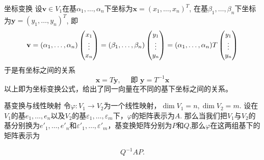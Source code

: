 \begin{frame}

\begin{block}{坐标变换}
设$\mathbf{v}\in V_1$在基$\alpha_1,\ldots,\alpha_n$下坐标为$\mathbf{x} = (x_1,\ldots,x_n)^T$, 在基$\beta_1,\ldots,\beta_n$下坐标为$\mathbf{y} = (y_1,\ldots,y_n)^T$, 即
\begin{displaymath}
\small
\mathbf{v} = (\alpha_1,\ldots,\alpha_n) \begin{pmatrix} x_1 \\ \vdots \\ x_n \end{pmatrix} = (\beta_1,\ldots,\beta_n) \begin{pmatrix} y_1 \\ \vdots \\ y_n \end{pmatrix} = (\alpha_1,\ldots,\alpha_n) T \begin{pmatrix} y_1 \\ \vdots \\ y_n \end{pmatrix}
\end{displaymath}
于是有坐标之间的关系
\[
\mathbf{x} = T\mathbf{y}, \quad \text{ 即 } \mathbf{y} = T^{-1}\mathbf{x}
\]
以上即为坐标变换公式，给出了同一向量在不同的基下坐标之间的关系。
\end{block}

\end{frame}


\begin{frame}

\begin{block}{基变换与线性映射}
令$\varphi: V_1 \to V_2$为一个线性映射，$\dim V_1 = n, \dim V_2 = m$. 设在$V_1$的基$e_1,\ldots,e_n$以及$V_2$的基$\varepsilon_1,\ldots,\varepsilon_m$下，$\varphi$的矩阵表示为$A$. 那么当我们把$V_1$与$V_2$的基分别换为$e'_1,\ldots,e'_n$和$\varepsilon'_1,\ldots,\varepsilon'_m$，基变换矩阵分别为$P$和$Q$,那么$\varphi$在这两组基下的矩阵表示为

\pause

\[Q^{-1}AP.\]
\end{block}

\end{frame}


